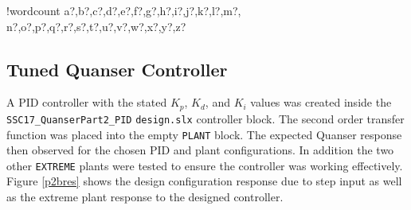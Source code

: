 \documentclass[11pt]{article}
\newcounter{words}
\newenvironment{counted}{%
  \setcounter{words}{0}
  \SearchList!{wordcount}{\stepcounter{words}}
    {a?,b?,c?,d?,e?,f?,g?,h?,i?,j?,k?,l?,m?,
    n?,o?,p?,q?,r?,s?,t?,u?,v?,w?,x?,y?,z?}
  \UndoBoundary{'}
  \SearchOrder{p;}}{%
  \StopSearching}
\begin{document}
\begin{counted}
\begin{figure}[H]
\begin{minipage}{.35\textwidth}
\label{paramtab}
\end{minipage}
\vspace{-20pt}
\end{figure}

\subsection{Tuned Quanser Controller}\label{tuned-quanser-controller}

A PID controller with the stated \(K_p\), \(K_d\), and \(K_i\) values
was created inside the \texttt{SSC17\_QuanserPart2\_PID}
\texttt{design.slx} controller block. The second order transfer function
was placed into the empty \texttt{PLANT} block. The expected Quanser
response then observed for the chosen PID and plant configurations. In
addition the two other \texttt{EXTREME} plants were tested to ensure the
controller was working effectively. Figure \ref{p2bres} shows the design
configuration response due to step input as well as the extreme plant
response to the designed controller.


\end{counted}
\end{document}
